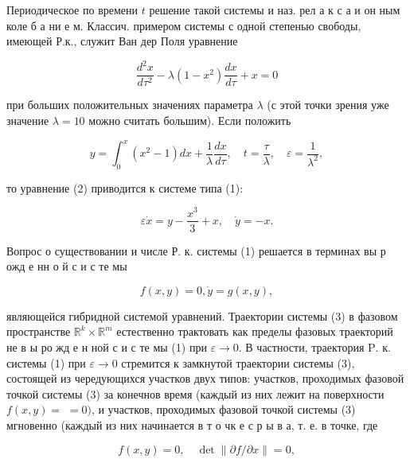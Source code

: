 \documentclass[10pt]{article}
\begin{document}
Периодическое по времени $t$ решение такой системы и наз. рел а к с а и он ным коле б а ни е м. Классич. примером системы с одной степенью свободы, имеющей Р.к., служит Ван дер Поля уравнение



\[

\frac{d^{2} x}{d \tau^{2}}-\lambda\left(1-x^{2}\right) \frac{d x}{d \tau}+x=0

\]



при больших положительных значениях параметра $\lambda$ (с этой точки зрения уже значение $\lambda=10$ можно считать большим). Если положить



\[

y=\int_{0}^{x}\left(x^{2}-1\right) d x+\frac{1}{\lambda} \frac{d x}{d \tau}, \quad t=\frac{\tau}{\lambda}, \quad \varepsilon=\frac{1}{\lambda^{2}},

\]



то уравнение (2) приводится к системе типа (1):



\[

\varepsilon \dot{x}=y-\frac{x^{3}}{3}+x, \quad \dot{y}=-x .

\]



Вопрос о существовании и числе Р. к. системы (1) решается в терминах вы р ожд е нн о й с и с те мы



\[

f(x, y)=0, \dot{y}=g(x, y),

\]



являющейся гибридной системой уравнений. Траектории системы (3) в фазовом пространстве $\mathbb{R}^{k} \times \mathbb{R}^{m}$ естественно трактовать как пределы фазовых траекторий не в ы ро жд е н ной с и с те мы (1) при $\varepsilon \rightarrow 0$. В частности, траектория $\mathrm{P}$. к. системы (1) при $\varepsilon \rightarrow 0$ стремится к замкнутой траектории системы (3), состоящей из чередующихся участков двух типов: участков, проходимых фазовой точкой системы (3) за конечнов время (каждый из них лежит на поверхности $f(x, y)=$ $=0)$, и участков, проходимых фазовой точкой системы (3) мгновенно (каждый из них начинается в т о чк е с р ы в а, т. е. в точке, где



\[

f(x, y)=0, \quad \operatorname{det}\|\partial f / \partial x\|=0,

\]
\end{document}
